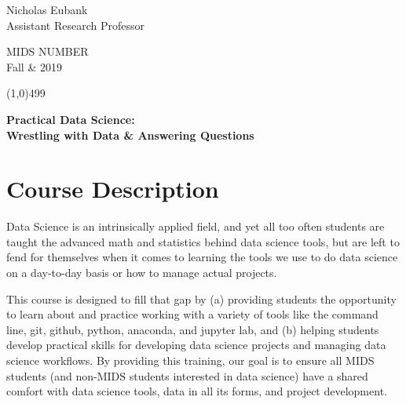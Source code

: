 \documentclass[12pt]{article}
\begin{document}
\singlespacing






\thispagestyle{empty}
\begin{minipage}[t]{.5\textwidth}
	Nicholas Eubank \\
	 Assistant Research Professor\\
     \vspace*{0.1cm}
\end{minipage}
\begin{minipage}[t]{.5\textwidth}
	\begin{flushright}  MIDS NUMBER\\
	Fall \& 2019\\
    \vspace*{0.1cm}
\end{flushright}
\end{minipage}


\line(1,0){499}

\vspace{.35in}

\begin{center}
	\textbf{\LARGE{Practical Data Science:} }\\
	\vspace*{.05in}
	\textbf{\large{Wrestling with Data \& Answering Questions }}
\end{center}








\section{Course Description}

Data Science is an intrinsically applied field, and yet all too often students are taught the advanced math and statistics behind data science tools, but are left to fend for themselves when it comes to learning the tools we use to do data science on a day-to-day basis or how to manage actual projects.

This course is designed to fill that gap by (a) providing students the opportunity to learn about and practice working with a variety of tools like the command line, git, github, python, anaconda, and jupyter lab, and (b) helping students develop practical skills for developing data science projects and managing data science workflows. By providing this training, our goal is to ensure all MIDS students (and non-MIDS students interested in data science) have a shared comfort with data science tools, data in all its forms, and project development.
\end{document}
